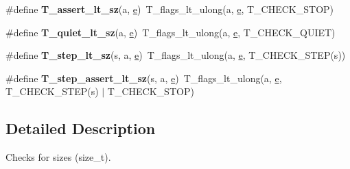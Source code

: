 \begin{DoxyCompactItemize}
\item 
\mbox{\label{group__RTEMSTestFrameworkChecksSZ_ga05c4ac1d070ee2cb9bdc4b5e1cbf7547}} 
\#define {\bfseries T\+\_\+assert\+\_\+lt\+\_\+sz}(a,  \mbox{\hyperlink{sun4u_2tte_8h_a8b0b9ed08e0e18920ec2682f48228c27}{e}})~T\+\_\+flags\+\_\+lt\+\_\+ulong(a, \mbox{\hyperlink{sun4u_2tte_8h_a8b0b9ed08e0e18920ec2682f48228c27}{e}}, T\+\_\+\+C\+H\+E\+C\+K\+\_\+\+S\+T\+OP)
\item 
\mbox{\label{group__RTEMSTestFrameworkChecksSZ_gab9fb8a4d1f3d88840ee642ded2e98d39}} 
\#define {\bfseries T\+\_\+quiet\+\_\+lt\+\_\+sz}(a,  \mbox{\hyperlink{sun4u_2tte_8h_a8b0b9ed08e0e18920ec2682f48228c27}{e}})~T\+\_\+flags\+\_\+lt\+\_\+ulong(a, \mbox{\hyperlink{sun4u_2tte_8h_a8b0b9ed08e0e18920ec2682f48228c27}{e}}, T\+\_\+\+C\+H\+E\+C\+K\+\_\+\+Q\+U\+I\+ET)
\item 
\mbox{\label{group__RTEMSTestFrameworkChecksSZ_ga3c88a38f102651102e3c5076d00e10b7}} 
\#define {\bfseries T\+\_\+step\+\_\+lt\+\_\+sz}(s,  a,  \mbox{\hyperlink{sun4u_2tte_8h_a8b0b9ed08e0e18920ec2682f48228c27}{e}})~T\+\_\+flags\+\_\+lt\+\_\+ulong(a, \mbox{\hyperlink{sun4u_2tte_8h_a8b0b9ed08e0e18920ec2682f48228c27}{e}}, T\+\_\+\+C\+H\+E\+C\+K\+\_\+\+S\+T\+EP(s))
\item 
\mbox{\label{group__RTEMSTestFrameworkChecksSZ_ga6cafd85342c19562bd6b72321812b388}} 
\#define {\bfseries T\+\_\+step\+\_\+assert\+\_\+lt\+\_\+sz}(s,  a,  \mbox{\hyperlink{sun4u_2tte_8h_a8b0b9ed08e0e18920ec2682f48228c27}{e}})~T\+\_\+flags\+\_\+lt\+\_\+ulong(a, \mbox{\hyperlink{sun4u_2tte_8h_a8b0b9ed08e0e18920ec2682f48228c27}{e}}, T\+\_\+\+C\+H\+E\+C\+K\+\_\+\+S\+T\+EP(s) $\vert$ T\+\_\+\+C\+H\+E\+C\+K\+\_\+\+S\+T\+OP)
\end{DoxyCompactItemize}


\subsection{Detailed Description}
Checks for sizes (size\+\_\+t). 

